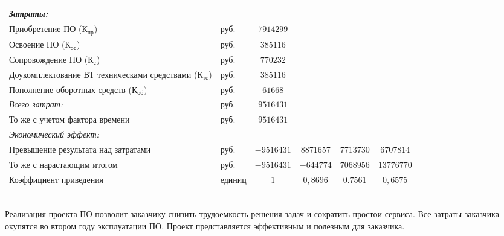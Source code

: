 {\begin{xtabular}{|p{0.3\textwidth}|>{\centering}p{0.15\textwidth}|c|c|c|c|}
    \hline
    \emph{Затраты:} & & & & & \\
    \hline
    Приобретение ПО ($\text{К}_\text{пр}$) & руб. & $7914299$ & & & \\
    \hline
    Освоение ПО ($\text{К}_\text{ос}$) & руб. & $385116$ & & & \\
    \hline
    Сопровождение ПО ($\text{К}_\text{с}$) & руб. & $770232$ & & & \\
    \hline
    Доукомплектование ВТ техническами средствами ($\text{К}_\text{тс}$) & руб. & $385116$ & & & \\
    \hline
    Пополнение оборотных средств ($\text{К}_\text{об}$) & руб. & $61668$ & & & \\
    \hline
    \emph{Всего затрат:} & руб. & $9516431$ & & & \\
    \hline
    То же с учетом фактора времени & руб. & $9516431$ & & & \\
    \hline
    \emph{Экономический эффект:} & & & & & \\
    \hline
    Превышение результата над затратами & руб. & $-9516431$ & $8871657$ & $7713730$ & $6707814$ \\
    \hline
    То же с нарастающим итогом & руб. & $-9516431$ & $-644774$ & $7068956$ & $13776770$ \\
    \hline
    Коэффициент приведения & единиц & $1$ & $0,8696$ & $0.7561$ & $0,6575$ \\
    \hline
  \end{xtabular}
}\\[0.5\baselineskip]

Реализация проекта ПО позволит заказчику снизить трудоемкость решения задач и сократить простои сервиса. Все затраты заказчика окупятся во втором году эксплуатации ПО. Проект представляется эффективным и полезным для заказчика.

\newpage

